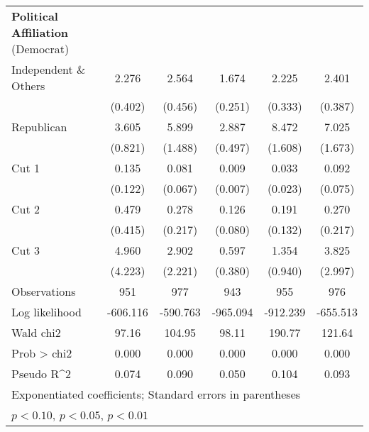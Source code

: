 \begin{table}[htbp]
\begin{tabular}{l*{5}{c}}
\textbf{Political Affiliation} (Democrat) &  &  &  &   & \\
Independent \& Others&       2.276\sym{***}&       2.564\sym{***}&       1.674\sym{***}&       2.225\sym{***}&       2.401\sym{***}\\
                    &     (0.402)         &     (0.456)         &     (0.251)         &     (0.333)         &     (0.387)         \\
Republican          &       3.605\sym{***}&       5.899\sym{***}&       2.887\sym{***}&       8.472\sym{***}&       7.025\sym{***}\\
                    &     (0.821)         &     (1.488)         &     (0.497)         &     (1.608)         &     (1.673)         \\

Cut 1               &       0.135\sym{**} &       0.081\sym{***}&       0.009\sym{***}&       0.033\sym{***}&       0.092\sym{***}\\
                    &     (0.122)         &     (0.067)         &     (0.007)         &     (0.023)         &     (0.075)         \\
Cut 2               &       0.479         &       0.278         &       0.126\sym{***}&       0.191\sym{**} &       0.270         \\
                    &     (0.415)         &     (0.217)         &     (0.080)         &     (0.132)         &     (0.217)         \\
Cut 3               &       4.960\sym{*}  &       2.902         &       0.597         &       1.354         &       3.825\sym{*}  \\
                    &     (4.223)         &     (2.221)         &     (0.380)         &     (0.940)         &     (2.997)         \\
\hline
Observations        &         951         &         977         &         943         &         955         &         976         \\
Log likelihood      &    -606.116         &    -590.763         &    -965.094         &    -912.239         &    -655.513         \\
Wald chi2           &       97.16         &      104.95         &       98.11         &      190.77         &      121.64         \\
Prob > chi2         &       0.000         &       0.000         &       0.000         &       0.000         &       0.000         \\
Pseudo R^2          &       0.074         &       0.090         &       0.050         &       0.104         &       0.093         \\
\hline\hline
\multicolumn{6}{l}{\footnotesize Exponentiated coefficients; Standard errors in parentheses}\\
\multicolumn{6}{l}{\footnotesize \sym{*} \(p<0.10\), \sym{**} \(p<0.05\), \sym{***} \(p<0.01\)}\\
\end{tabular}
\end{table}
